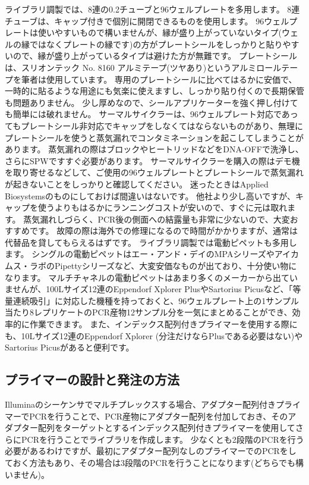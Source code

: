 \documentclass[titlepage,10pt,a4paper]{jsbook}
\begin{document}
ライブラリ調製では、8連の0.2チューブと96ウェルプレートを多用します。
8連チューブは、キャップ付きで個別に開閉できるものを使用します。
96ウェルプレートは使いやすいもので構いませんが、縁が盛り上がっていないタイプ(ウェルの縁ではなくプレートの縁です)の方がプレートシールをしっかりと貼りやすいので、縁が盛り上がっているタイプは避けた方が無難です。
プレートシールは、スリオンテック No. 8160 アルミテープ(ツヤあり)というアルミロールテープを筆者は使用しています。
専用のプレートシールに比べてはるかに安価で、一時的に貼るような用途にも気楽に使えますし、しっかり貼り付くので長期保管も問題ありません。
少し厚めなので、シールアプリケーターを強く押し付けても簡単には破れません。
サーマルサイクラーは、96ウェルプレート対応であってもプレートシール非対応でキャップをしなくてはならないものがあり、無理にプレートシールを使うと蒸気漏れでコンタミネーションを起こしてしまうことがあります。
蒸気漏れの際はブロックやヒートリッドなどをDNA-OFFで洗浄し、さらにSPWですすぐ必要があります。
サーマルサイクラーを購入の際はデモ機を取り寄せるなどして、ご使用の96ウェルプレートとプレートシールで蒸気漏れが起きないことをしっかりと確認してください。
迷ったときはApplied Biosystemsのものにしておけば間違いはないです。
他社より少し高いですが、キャップを使うよりもはるかにランニングコストが安いので、すぐに元は取れます。
蒸気漏れしづらく、PCR後の側面への結露量も非常に少ないので、大変おすすめです。
故障の際は海外での修理になるので時間がかかりますが、通常は代替品を貸してもらえるはずです。
ライブラリ調製では電動ピペットも多用します。
シングルの電動ピペットはエー・アンド・デイのMPAシリーズやアイカムス・ラボのPipettyシリーズなど、大変安価なものが出ており、十分使い物になります。
マルチチャネルの電動ピペットはあまり多くのメーカーから出ていませんが、100{\textmu}Lサイズ12連のEppendorf Xplorer PlusやSartorius Picusなど、「等量連続吸引」に対応した機種を持っておくと、96ウェルプレート上の1サンプル当たり8レプリケートのPCR産物12サンプル分を一気にまとめることができ、効率的に作業できます。
また、インデックス配列付きプライマーを使用する際にも、10{\textmu}Lサイズ12連のEppendorf Xplorer (分注だけならPlusである必要はない)やSartorius Picusがあると便利です。

\subsection{プライマーの設計と発注の方法}

Illuminaのシーケンサでマルチプレックスする場合、アダプター配列付きプライマーでPCRを行うことで、PCR産物にアダプター配列を付加しておき、そのアダプター配列をターゲットとするインデックス配列付きプライマーを使用してさらにPCRを行うことでライブラリを作成します。
少なくとも2段階のPCRを行う必要があるわけですが、最初にアダプター配列なしのプライマーでのPCRをしておく方法もあり、その場合は3段階のPCRを行うことになります(どちらでも構いません)。
\end{document}
